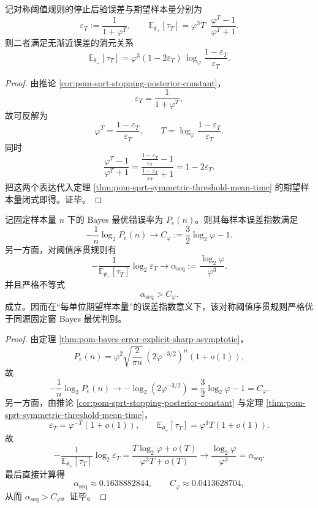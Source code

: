 \begin{theorem}[风险--时间前沿的精确消元律]\label{thm:conclusion-golden-sprt-risk-time-elimination}
记对称阈值规则的停止后验误差与期望样本量分别为
\[
\varepsilon_T:=\frac{1}{1+\varphi^T},
\qquad
\mathbb E_{\theta_+}[\tau_T]
=
\varphi^3T\cdot\frac{\varphi^T-1}{\varphi^T+1}.
\]
则二者满足无渐近误差的消元关系
\[
\boxed{\;
\mathbb E_{\theta_+}[\tau_T]
=
\varphi^3(1-2\varepsilon_T)\,
\log_\varphi\!\frac{1-\varepsilon_T}{\varepsilon_T}.
\;}
\]
\end{theorem}
\begin{proof}
由推论 \ref{cor:pom-sprt-stopping-posterior-constant}，
\[
\varepsilon_T=\frac{1}{1+\varphi^T},
\]
故可反解为
\[
\varphi^T=\frac{1-\varepsilon_T}{\varepsilon_T},
\qquad
T=\log_\varphi\!\frac{1-\varepsilon_T}{\varepsilon_T}.
\]
同时
\[
\frac{\varphi^T-1}{\varphi^T+1}
=
\frac{\frac{1-\varepsilon_T}{\varepsilon_T}-1}{\frac{1-\varepsilon_T}{\varepsilon_T}+1}
=
1-2\varepsilon_T.
\]
把这两个表达代入定理 \ref{thm:pom-sprt-symmetric-threshold-mean-time} 的期望样本量闭式即得。证毕。
\end{proof}

\begin{theorem}\label{thm:conclusion-golden-sprt-sequential-exponent-dominates-fixed-window}
记固定样本量 \(n\) 下的 Bayes 最优错误率为 \(P_e(n)\)。则其每样本误差指数满足
\[
-\frac{1}{n}\log_2 P_e(n)\longrightarrow
C_\varphi:=\frac32\log_2\varphi-1.
\]
另一方面，对阈值序贯规则有
\[
-\frac{1}{\mathbb E_{\theta_+}[\tau_T]}\log_2 \varepsilon_T
\longrightarrow
\alpha_{\mathrm{seq}}
:=
\frac{\log_2\varphi}{\varphi^3}.
\]
并且严格不等式
\[
\boxed{\;\alpha_{\mathrm{seq}}>C_\varphi.\;}
\]
成立。因而在“每单位期望样本量”的误差指数意义下，该对称阈值序贯规则严格优于同源固定窗 Bayes 最优判别。
\end{theorem}
\begin{proof}
由定理 \ref{thm:pom-bayes-error-explicit-sharp-asymptotic}，
\[
P_e(n)=\varphi^2\sqrt{\frac{2}{\pi n}}\,(2\varphi^{-3/2})^n(1+o(1)),
\]
故
\[
-\frac{1}{n}\log_2 P_e(n)\to -\log_2(2\varphi^{-3/2})=\frac32\log_2\varphi-1=C_\varphi.
\]
另一方面，由推论 \ref{cor:pom-sprt-stopping-posterior-constant} 与定理 \ref{thm:pom-sprt-symmetric-threshold-mean-time}，
\[
\varepsilon_T=\varphi^{-T}(1+o(1)),
\qquad
\mathbb E_{\theta_+}[\tau_T]=\varphi^3T(1+o(1)).
\]
故
\[
-\frac{1}{\mathbb E_{\theta_+}[\tau_T]}\log_2 \varepsilon_T
=
\frac{T\log_2\varphi+o(T)}{\varphi^3T+o(T)}
\longrightarrow
\frac{\log_2\varphi}{\varphi^3}
=
\alpha_{\mathrm{seq}}.
\]
最后直接计算得
\[
\alpha_{\mathrm{seq}}\approx 0.1638882844,
\qquad
C_\varphi\approx 0.0413628704,
\]
从而 \(\alpha_{\mathrm{seq}}>C_\varphi\)。证毕。
\end{proof}

